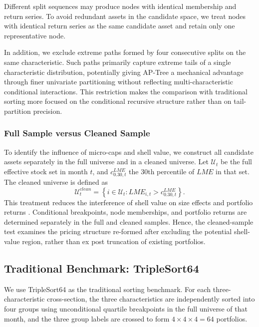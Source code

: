 \documentclass[12pt]{article}
\def\mathrm#1{#1}%
\begin{document}
Different split sequences may produce nodes with identical membership and return series. To avoid redundant assets in the candidate space, we treat nodes with identical return series as the same candidate asset and retain only one representative node.

In addition, we exclude extreme paths formed by four consecutive splits on the same characteristic. Such paths primarily capture extreme tails of a single characteristic distribution, potentially giving AP-Tree a mechanical advantage through finer univariate partitioning without reflecting multi-characteristic conditional interactions. This restriction makes the comparison with traditional sorting more focused on the conditional recursive structure rather than on tail-partition precision.

\subsubsection{Full Sample versus Cleaned Sample}

To identify the influence of micro-caps and shell value, we construct all candidate assets separately in the full universe and in a cleaned universe. Let \(\mathcal U_t\) be the full effective stock set in month \(t\), and \(c_{0.30,t}^{\mathrm{LME}}\) the 30th percentile of \(\mathrm{LME}\) in that set. The cleaned universe is defined as
\begin{equation}
  \mathcal U_t^{\mathrm{clean}}
  =
  \left\{
    i\in\mathcal U_t:
    \mathrm{LME}_{i,t}>c_{0.30,t}^{\mathrm{LME}}
  \right\}.
  \label{eq:clean_universe}
\end{equation}
This treatment reduces the interference of shell value on size effects and portfolio returns \cite{ref17}. Conditional breakpoints, node memberships, and portfolio returns are determined separately in the full and cleaned samples. Hence, the cleaned-sample test examines the pricing structure re-formed after excluding the potential shell-value region, rather than ex post truncation of existing portfolios.

\subsection{Traditional Benchmark: TripleSort64}
\label{subsec:triple_sort}

We use TripleSort64 as the traditional sorting benchmark. For each three-characteristic cross-section, the three characteristics are independently sorted into four groups using unconditional quartile breakpoints in the full universe of that month, and the three group labels are crossed to form \(4\times4\times4=64\) portfolios.
\end{document}
